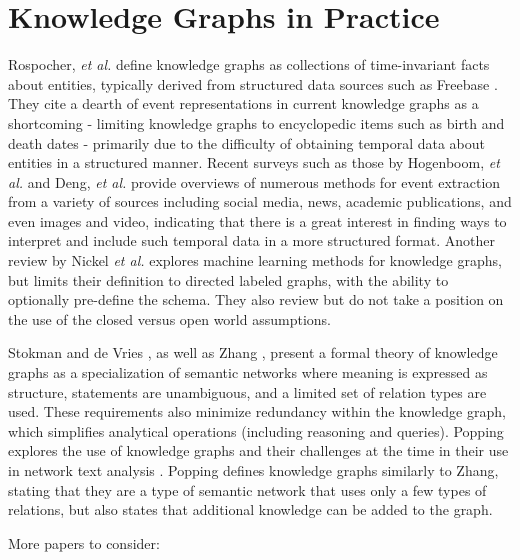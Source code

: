 \section{Knowledge Graphs in Practice}
Rospocher, \textit{et al.} define knowledge graphs as collections of time-invariant facts about entities, typically derived from structured data sources such as Freebase \cite{Rospocher2016}. They cite a dearth of event representations in current knowledge graphs as a shortcoming - limiting knowledge graphs to encyclopedic items such as birth and death dates - primarily due to the difficulty of obtaining temporal data about entities in a structured manner. Recent surveys such as those by Hogenboom, \textit{et al.} \cite{Hogenboom2016} and Deng, \textit{et al.} \cite{Deng2015} provide overviews of numerous methods for event extraction from a variety of sources including social media, news, academic publications, and even images and video, indicating that there is a great interest in finding ways to interpret and include such temporal data in a more structured format.
Another review by Nickel \emph{et al.} explores machine learning methods for knowledge graphs, but limits their definition to directed labeled graphs, with the ability to optionally pre-define the schema.
They also review but do not take a position on the use of the closed versus open world assumptions.

Stokman and de Vries \cite{Stokman_1988}, as well as Zhang \cite{zhang2002knowledge}, present a formal theory of knowledge graphs as a specialization of semantic networks where meaning is expressed as structure, statements are unambiguous, and a limited set of relation types are used.
These requirements also minimize redundancy within the knowledge graph, which simplifies analytical operations (including reasoning and queries).
Popping explores the use of knowledge graphs and their challenges at the time in their use in network text analysis \cite{Popping_2003}. 
Popping defines knowledge graphs similarly to Zhang, stating that they are a type of semantic network that uses only a few types of relations, but also states that additional knowledge can be added to the graph.

More papers to consider: \cite{Dieng_1992} \cite{Juel_Vang_2013} \cite{10110943220141101}

